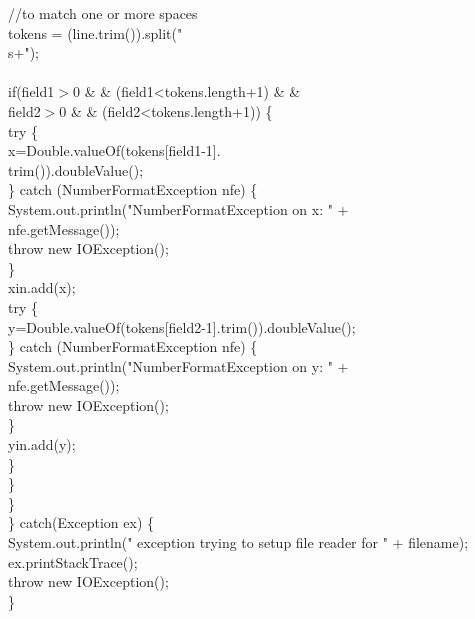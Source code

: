  	     //to match one or more spaces \\
                tokens = (line.trim()).split("\\s+"); \\
 \\
                if(field1$>$0 \& \& (field1<tokens.length+1) \& \& \\
                   field2$>$0 \& \& (field2<tokens.length+1)) \{ \\
                    try \{ \\
                       x=Double.valueOf(tokens[field1-1]. \\
	               trim()).doubleValue(); \\
                    \} catch (NumberFormatException nfe) \{ \\
                        System.out.println("NumberFormatException on x: " + \\
                                            nfe.getMessage()); \\
                        throw new IOException(); \\
                    \} \\
                    xin.add(x); \\
                    try \{ \\
                        y=Double.valueOf(tokens[field2-1].trim()).doubleValue(); \\
                    \} catch (NumberFormatException nfe) \{ \\
                        System.out.println("NumberFormatException on y: " + \\
                                            nfe.getMessage()); \\
                        throw new IOException(); \\
                    \} \\
                    yin.add(y); \\
                \} \\
                \} \\
            \} \\
        \} catch(Exception ex) \{ \\
            System.out.println(" exception trying to setup file reader for " + filename); \\
            ex.printStackTrace(); \\
            throw new IOException(); \\
        \} \\
